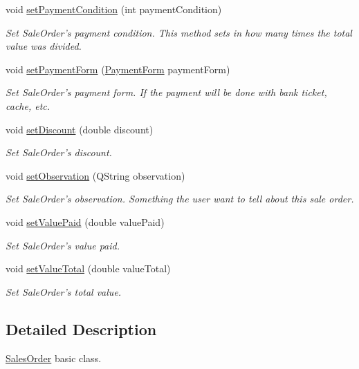 \begin{DoxyCompactItemize}
void \hyperlink{class_sales_order_a2a02260c1308f70c60910e41abe67a3d}{set\-Payment\-Condition} (int payment\-Condition)
\begin{DoxyCompactList}\small\item\em \-Set \-Sale\-Order's payment condition. \-This method sets in how many times the total value was divided. \end{DoxyCompactList}\item 
void \hyperlink{class_sales_order_a6b38c8982ceb3633cc1a024e5ce07fea}{set\-Payment\-Form} (\hyperlink{class_sales_order_aea62d62de9cfe64f734061c664156744}{\-Payment\-Form} payment\-Form)
\begin{DoxyCompactList}\small\item\em \-Set \-Sale\-Order's payment form. \-If the payment will be done with bank ticket, cache, etc. \end{DoxyCompactList}\item 
void \hyperlink{class_sales_order_a2f14e1b6db1510d203e149c90d2171fe}{set\-Discount} (double discount)
\begin{DoxyCompactList}\small\item\em \-Set \-Sale\-Order's discount. \end{DoxyCompactList}\item 
void \hyperlink{class_sales_order_a31b856a3da35b31f9dc3f5987110f864}{set\-Observation} (\-Q\-String observation)
\begin{DoxyCompactList}\small\item\em \-Set \-Sale\-Order's observation. \-Something the user want to tell about this sale order. \end{DoxyCompactList}\item 
void \hyperlink{class_sales_order_a162cf0923d0e1b29b83b1a64e9e7c706}{set\-Value\-Paid} (double value\-Paid)
\begin{DoxyCompactList}\small\item\em \-Set \-Sale\-Order's value paid. \end{DoxyCompactList}\item 
void \hyperlink{class_sales_order_a9c930a4155cfdf4b5d460cb9b4233e8a}{set\-Value\-Total} (double value\-Total)
\begin{DoxyCompactList}\small\item\em \-Set \-Sale\-Order's total value. \end{DoxyCompactList}\end{DoxyCompactItemize}


\subsection{\-Detailed \-Description}
\hyperlink{class_sales_order}{\-Sales\-Order} basic class. 

